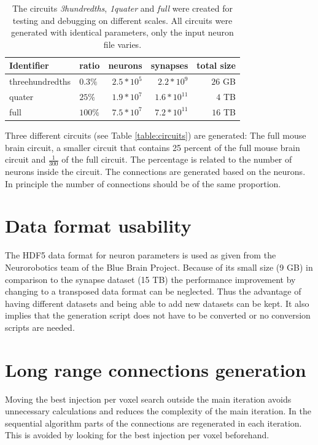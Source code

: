 \begin{table}[ht!]
\begin{centering}
    \begin{tabular}{ | l | l | r | r | r |}
    \hline
    Identifier & ratio & neurons & synapses & total size \\ \hline \hline
    threehundredths & $0.3\%$ & $~2.5*10^5$ & $~2.2*10^9$ & $~26$ GB \\ \hline
    quater & $25\%$ & $~1.9*10^7$ & $~1.6*10^{11}$ & $~4$ TB \\ \hline
    full & $100\%$ & $~7.5*10^7$ & $~7.2*10^{11}$ & $~16$ TB \\ \hline
    \end{tabular}
    \caption{The circuits \emph{3hundredths}, \emph{1quater} and \emph{full} were created for testing and debugging on different scales.
All circuits were generated with identical parameters, only the input neuron file varies.}
\end{centering}
    \end{table}


\label{table:circuits}

Three different circuits (see Table \ref{table:circuits}) are generated: The full mouse brain circuit,
a smaller circuit that contains 25 percent of the full mouse brain circuit and
$\frac{1}{300}$ of the full circuit. The percentage is related to the number of neurons inside
the circuit. The connections are generated based on the neurons. In principle the
number of connections should be of the same proportion.

\section{Data format usability}
The HDF5 data format for neuron parameters is used as given from the Neurorobotics team of the Blue Brain Project.
Because of its small size (9 GB) in comparison to the synapse dataset (15 TB) the performance improvement by changing
to a transposed data format can be neglected. Thus the advantage of having different datasets and being able
to add new datasets can be kept. It also implies that the generation script does not have to be converted or no 
conversion scripts are needed.


\section{Long range connections generation}
Moving the best injection per voxel search outside the main iteration
avoids unnecessary calculations and reduces the complexity of the main iteration.
In the sequential algorithm parts of the connections are regenerated in each iteration.
This is avoided by looking for the best injection per voxel beforehand.


